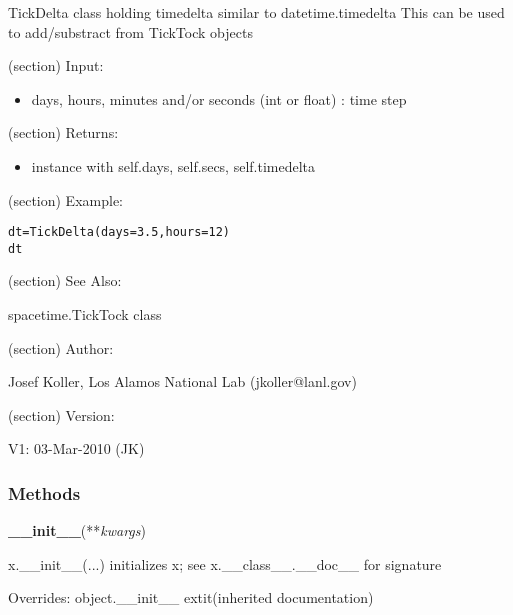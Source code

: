 TickDelta class holding timedelta similar to datetime.timedelta This can be
used to add/substract from TickTock objects

(section) Input:

  \begin{itemize}
  \setlength{\parskip}{0.6ex}
    \item days, hours, minutes and/or seconds (int or float) : time step

  \end{itemize}

(section) Returns:

  \begin{itemize}
  \setlength{\parskip}{0.6ex}
    \item instance with self.days, self.secs, self.timedelta

  \end{itemize}

(section) Example:

\begin{alltt}
\pysrcprompt{{\textgreater}{\textgreater}{\textgreater} }dt = TickDelta(days=3.5, hours=12)
\pysrcprompt{{\textgreater}{\textgreater}{\textgreater} }dt
\end{alltt}
(section) See Also:

  spacetime.TickTock class

(section) Author:

  Josef Koller, Los Alamos National Lab (jkoller@lanl.gov)

(section) Version:

  V1: 03-Mar-2010 (JK)



  \subsubsection{Methods}

    \vspace{0.5ex}

\hspace{.8\funcindent}\begin{boxedminipage}{\funcwidth}

    \raggedright \textbf{\_\_init\_\_}(**\textit{kwargs})

\setlength{\parskip}{2ex}
    x.\_\_init\_\_(...) initializes x; see x.\_\_class\_\_.\_\_doc\_\_ for 
    signature

\setlength{\parskip}{1ex}
      Overrides: object.\_\_init\_\_ 	extit{(inherited documentation)}

    \end{boxedminipage}

